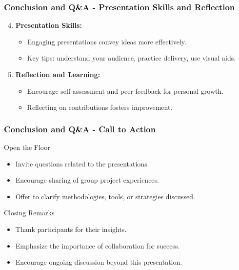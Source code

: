 \documentclass{beamer}
\begin{document}
\begin{frame}[fragile]
    \frametitle{Conclusion and Q\&A - Presentation Skills and Reflection}
    \begin{enumerate}
        \setcounter{enumi}{3}  %
        \item \textbf{Presentation Skills:}
            \begin{itemize}
                \item Engaging presentations convey ideas more effectively.
                \item Key tips: understand your audience, practice delivery, use visual aids.
            \end{itemize}

        \item \textbf{Reflection and Learning:}
            \begin{itemize}
                \item Encourage self-assessment and peer feedback for personal growth.
                \item Reflecting on contributions fosters improvement.
            \end{itemize}
    \end{enumerate}
\end{frame}

\begin{frame}[fragile]
    \frametitle{Conclusion and Q\&A - Call to Action}
    \begin{block}{Open the Floor}
        \begin{itemize}
            \item Invite questions related to the presentations.
            \item Encourage sharing of group project experiences.
            \item Offer to clarify methodologies, tools, or strategies discussed.
        \end{itemize}
    \end{block}

    \begin{block}{Closing Remarks}
        \begin{itemize}
            \item Thank participants for their insights.
            \item Emphasize the importance of collaboration for success.
            \item Encourage ongoing discussion beyond this presentation.
        \end{itemize}
    \end{block}
\end{frame}
\end{document}

